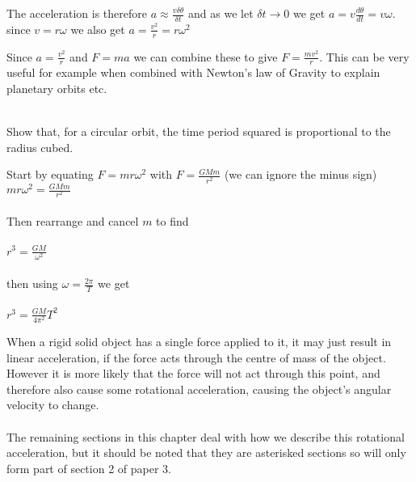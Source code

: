 \documentclass[main.tex]{subfiles}
\begin{document}
The acceleration is therefore $a\approx\frac{v\delta\theta}{\delta t}$ and as we let $\delta t\rightarrow0$ we get $a=v\frac{d\theta}{dt}=v\omega$.
\\
since $v=r\omega$ we also get $a=\frac{v^2}{r}=r\omega^2$




Since $a = \frac{v ^{2}}{r}$ and $F=ma$ we can combine these to give $F=\frac{mv^2}{r}$. This can be very useful for example when combined with Newton's law of Gravity to explain planetary orbits etc.
\\
\\

\begin{example}
	Show that, for a circular orbit, the time period squared is proportional to the radius cubed.

 	\answer Start by equating $F=mr\omega^2$ with $F= \frac{GMm}{r^2}$ (we can ignore the minus sign)
\\

$mr\omega^{2}= \frac{GMm}{r^2}$
\\
\\
Then rearrange and cancel $m$ to find
\\
\\
$r^{3}=\frac{GM}{\omega^2}$
\\
\\
then using $\omega=\frac{2\pi}{T}$ we get
\\
\\
$r^{3}=\frac{GM}{4\pi^{2}}T^2$

\end{example}


When a rigid solid object has a single force applied to it, it may just result in linear acceleration, if the force acts through the centre of mass of the object. However it is more likely that the force will not act through this point, and therefore also cause some rotational acceleration, causing the object's angular velocity to change.
\\
\\
The remaining sections in this chapter deal with how we describe this rotational acceleration, but it should be noted that they are asterisked sections so will only form part of section 2 of paper 3.
\end{document}
